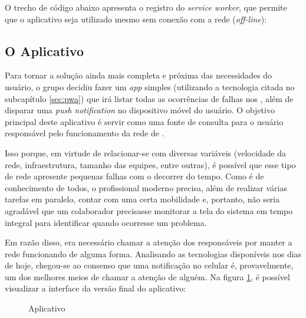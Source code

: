 O trecho de código abaixo apresenta o registro do \textit{service worker}, que permite que o aplicativo seja utilizado mesmo sem conexão com a rede (\textit{off-line}):

\vspace*{1cm}
\begin{python}
    if ('serviceWorker' in navigator) {
        navigator.serviceWorker
            .register('service-worker.js')
            .then(reg => console.log("[ServiceWorker] Registered..."))
            [ . . .]
\end{python}
\vspace*{1cm}



\subsection{O Aplicativo}
\label{subsec:o_aplicativo}

Para tornar a solução ainda mais completa e próxima das necessidades do usuário, o grupo decidiu fazer um \textit{app} simples (utilizando a tecnologia citada no subcapítulo \ref{sec:pwa}) que irá listar todas as ocorrências de falhas nos \containers{}, além de disparar uma \textit{push notification} no dispositivo móvel do usuário. O objetivo principal deste aplicativo é servir como uma fonte de consulta para o usuário responsável pelo funcionamento da rede de \containers{}.

Isso porque, em virtude de relacionar-se com diversas variáveis (velocidade da rede, infraestrutura, tamanho das equipes, entre outras), é possível que esse tipo de rede apresente pequenas falhas com o decorrer do tempo. Como é de conhecimento de todos, o profissional moderno precisa, além de realizar várias tarefas em paralelo, contar com uma certa mobilidade e, portanto, não seria agradável que um colaborador precisasse monitorar a tela do sistema em tempo integral para identificar quando ocorresse um problema.

Em razão disso, era necessário chamar a atenção dos responsáveis por manter a rede funcionando de alguma forma. Analisando as tecnologias disponíveis nos dias de hoje, chegou-se ao consenso que uma notificação no celular é, provavelmente, um dos melhores meios de chamar a atenção de alguém. Na figura \ref{fig:aplicativo}, é possível visualizar a interface da versão final do aplicativo:

\begin{figure}[!htb]
    \centering
    \caption{Aplicativo}
    \label{fig:aplicativo}
\end{figure}